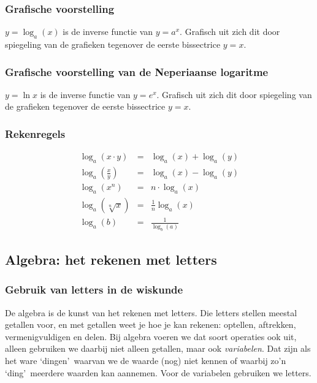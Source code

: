 \subsubsection{Grafische voorstelling}

$y=\log_{a}(x)$ is de inverse functie van $y=a^x$. Grafisch uit zich dit door spiegeling van de grafieken tegenover de eerste bissectrice $y=x$.



\subsubsection{Grafische voorstelling van de Neperiaanse logaritme}

$y=\ln x$ is de inverse functie van $y=e^x$. Grafisch uit zich dit door spiegeling van de grafieken tegenover de eerste bissectrice $y=x$.




\subsubsection{Rekenregels}

\begin{ftrekenregel}
	\begin{eqnarray*}
		\log_{a}(x \cdot y) &=& \log_{a}(x) + \log_{a}(y) \\
		\log_{a}(\frac{x}{y}) &=& \log_{a}(x) - \log_{a}(y) \\
		\log_{a}(x^n) &=& n \cdot \log_{a}(x) \\
		\log_{a}(\sqrt[n]{x}) &=& \frac{1}{n}\log_{a}(x) \\
		\log_{a}(b) &=& \frac{1}{\log_{b}(a)} 
	\end{eqnarray*}
\end{ftrekenregel}


\subsection{Algebra: het rekenen met letters}


\subsubsection{Gebruik van letters in de wiskunde}

De algebra is de kunst van het rekenen met letters. Die letters stellen
meestal getallen voor, en met getallen weet je hoe je kan rekenen:
optellen, aftrekken, vermenigvuldigen en delen. Bij algebra voeren
we dat soort operaties ook uit, alleen gebruiken we daarbij niet alleen
getallen, maar ook \emph{variabelen}. Dat zijn als het ware \textquoteleft dingen\textquoteright \
waarvan we de waarde (nog) niet kennen of waarbij zo'n \textquoteleft ding\textquoteright \  meerdere
waarden kan aannemen. Voor de variabelen gebruiken we letters.

